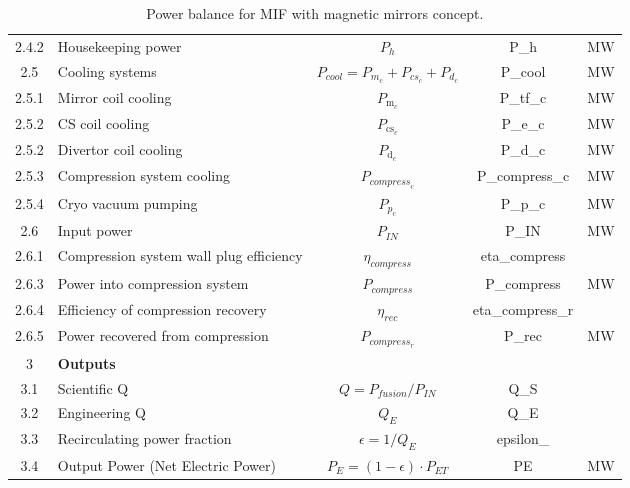 \begin{table}[h]
{\begin{tabular}{cp{6.5cm}ccc}
2.4.2	&	Housekeeping power	&	$P_{{h}}$	&	P_h	&	MW \\
2.5	&	Cooling systems	&	$P_{{cool}} = P_{{m}_c} + P_{{cs}_c}+P_{{d}_c}$	&	P_cool	&	MW \\
2.5.1 & Mirror coil cooling & $P_{\text{m}_c}$ & P_tf_c & MW \\
2.5.2 & CS coil cooling & $P_{\text{cs}_c}$ & P_e_c & MW \\
2.5.2 & Divertor coil cooling & $P_{\text{d}_c}$ & P_d_c & MW \\
2.5.3	&	Compression system cooling	&	$P_{{compress}_c}$	&	P_compress_c	&	MW \\
2.5.4	&	Cryo vacuum pumping	&	$P_{{p}_c}$	&	P_p_c	&	MW \\
2.6	&	Input power	&	$P_{{IN}}$	&	P_IN	&	MW \\
2.6.1	&	Compression system wall plug efficiency	&	$\eta_{{compress}}$	&	eta_compress	&	\\
2.6.3	&	Power into compression system	&	$P_{{compress}}$	&	P_compress	&	MW \\
2.6.4	&	Efficiency of compression recovery	&	$\eta_{{rec}}$	&	eta_compress_r	&	 \\
2.6.5	&	Power recovered from compression	&	$P_{{compress}_r}$	&	P_rec	&	MW \\
\hline								
3	&	\textbf{Outputs}	&		&		&	\\
3.1	&	Scientific Q	&	$Q = P_{{fusion}}/P_{{IN}}$	&	Q_S	&	\\
3.2	&	Engineering Q	&	$Q_{{E}}$	&	Q_E	&	\\
3.3	&	Recirculating power fraction	&	$\epsilon = 1/Q_{{E}}$	&	epsilon_	&	\\
3.4	&	Output Power (Net Electric Power)	&	$P_{{E}} = (1 - \epsilon) \cdot P_{{ET}}$	&	PE	&	MW \\
\hline								
\end{tabular}	
}
\caption{Power balance for MIF with magnetic mirrors concept.}
\end{table}	

\\\\ 

